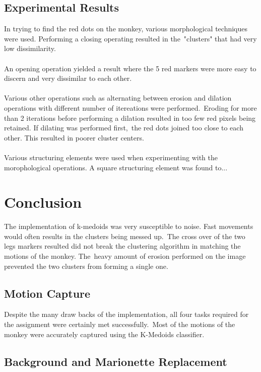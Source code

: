 \documentclass[12pt,a4paper]{article}
\begin{document}
      \subsection{Experimental Results}
      In trying to find the red dots on the monkey, various morphological techniques were used. Performing a closing operating resulted in the\
      "clusters" that had very low dissimilarity.
      \\\\
      An opening operation yielded a result where the 5 red markers were more easy to discern and very dissimilar to each other.
      \\\\
      Various other operations such as alternating between erosion and dilation operations with different number of itereations were performed.\
      Eroding for more than 2 iterations before performing a dilation resulted in too few red pixels being retained. If dilating was performed first,\
      the red dots joined too close to each other. This resulted in poorer cluster centers.
      \\\\
      Various structuring elements were used when experimenting with the morophological operations. A square structuring element was found to...

    \section{Conclusion}

    The implementation of k-medoids was very susceptible to noise. Fast movements would often results in the clusters being messed up.\
    The cross over of the two legs markers resulted did not break the clustering algorithm in matching the motions of the monkey. The\
    heavy amount of erosion performed on the image prevented the two clusters from forming a single one.

      \subsection{Motion Capture}

      Despite the many draw backs of the implementation, all four tasks required for the assignment were certainly met successfully.\
      Most of the motions of the monkey were accurately captured using the K-Medoids classifier.

      \subsection{Background and Marionette Replacement}
\end{document}
